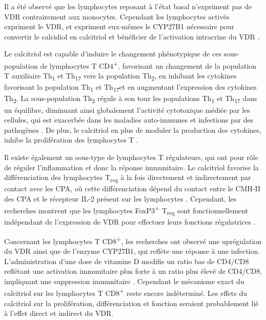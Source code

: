 \documentclass[
  a4paper,
  DIV=11,
  numbers=noendperiod,
  listof=totoc]{scrreprt}
\begin{document}
Il a été observé que les lymphocytes reposant à l'état basal n'expriment
pas de \ac{VDR} contrairement aux monocytes. Cependant les lymphocytes
activés expriment le \ac{VDR}, et expriment eux-mêmes le \ac{CYP27B1}
nécessaire pour convertir le calcidiol en calcitriol et bénéficier de
l'activation intracrine du \ac{VDR} \autocite{Charoenngam.2020}.

Le calcitriol est capable d'induire le changement phénotypique de ces
sous-population de lymphocytes T CD4\textsuperscript{+}, favorisant un
changement de la population T auxiliaire Th\textsubscript{1} et
Th\textsubscript{17} vers la population Th\textsubscript{2}, en inhibant
les cytokines favorisant la population Th\textsubscript{1} et
Th\textsubscript{17}et en augmentant l'expression des cytokines
Th\textsubscript{2}. La sous-population Th\textsubscript{2} régule à son
tour les populations Th\textsubscript{1} et Th\textsubscript{17} dans un
équilibre, diminuant ainsi globalement l'activité cytotoxique médiée par
les cellules, qui est exacerbée dans les maladies auto-immunes et
infections par des pathogènes \autocite{Meza-Meza.2022}. De plus, le
calcitriol en plus de moduler la production des cytokines, inhibe la
prolifération des lymphocytes T \autocite{Cantorna.2015}.

Il existe également un sous-type de lymphocytes T régulateurs, qui ont
pour rôle de réguler l'inflammation et donc la réponse immunitaire. Le
calcitriol favorise la différenciation des lymphocytes
T\textsubscript{reg} à la fois directement et indirectement par contact
avec les \ac{CPA}, où cette différenciation dépend du contact entre le
\ac{CMH-II} des \ac{CPA} et le récepteur \ac{IL-2} présent sur les
lymphocytes \autocite{Charoenngam.2020}. Cependant, les recherches
montrent que les lymphocytes FoxP3\textsuperscript{+}
T\textsubscript{reg} sont fonctionnellement indépendant de l'expression
de VDR pour effectuer leurs fonctions régulatrices
\autocite{Cantorna.2010}.

Concernant les lymphocytes T CD8\textsuperscript{+}, les recherches ont
observé une uprégulation du VDR ainsi que de l'enzyme CYP27B1, qui
reflète une réponse à une infection. L'administration d'une dose de
vitamine D modifie un ratio bas de CD4/CD8 reflétant une activation
immunitaire plus forte à un ratio plus élevé de CD4/CD8, impliquant une
suppression immunitaire \autocite{Meza-Meza.2022}. Cependant le
mécanisme exact du calcitriol sur les lymphocytes T
CD8\textsuperscript{+} reste encore indéterminé. Les effets du
calcitriol sur la prolifération, différenciation et fonction seraient
probablement lié à l'effet direct et indirect du VDR.
\end{document}

